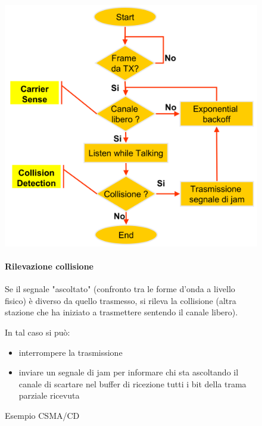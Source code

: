 \begin{figure}[htbp]
    \centering
    \begin{minipage}{0.5\textwidth}
        \includegraphics[width=\linewidth]{images/esempiocsmacd.png}
        \caption{Esempio CSMA/CD}
        \label{fig:csma-cd}
    \end{minipage}%
    \hfill
    \begin{minipage}{0.45\textwidth}
        \paragraph{Rilevazione collisione}
Se il segnale "ascoltato" (confronto tra le forme d'onda a livello fisico) è diverso
da quello trasmesso, si rileva la collisione (altra stazione che ha iniziato a
trasmettere sentendo il canale libero). 

In tal caso si può:

\begin{itemize}
    \item interrompere la trasmissione 
    \item inviare un segnale di jam per informare chi sta ascoltando il canale di scartare nel buffer di
ricezione tutti i bit della trama parziale ricevuta
\end{itemize}
    \end{minipage}
\end{figure}
